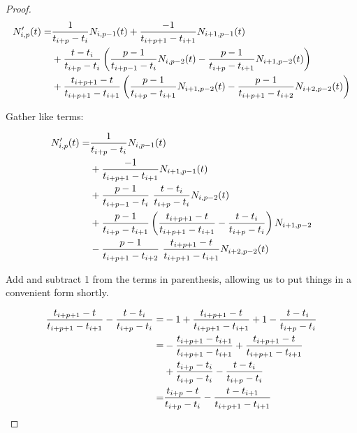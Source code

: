 \begin{appendices}
\begin{proof}
\begin{equation}
\begin{split}
N_{i,p}'(t) =& \frac{1}{t_{i+p} - t_i} N_{i,p-1}(t) + \frac{-1}{t_{i+p+1} - t_{i+1}} N_{i+1,p-1}(t) \\ 
& + \frac{t-t_i}{t_{i+p}-t_i} \left( \frac{p-1}{t_{i+p-1} - t_i} N_{i,p-2}(t) - \frac{p-1}{t_{i+p} - t_{i+1}} N_{i+1,p-2}(t) \right) \\
&+ \frac{t_{i+p+1}-t}{t_{i+p+1}-t_{i+1}} \left( \frac{p-1}{t_{i+p} - t_{i+1}} N_{i+1,p-2}(t) - \frac{p-1}{t_{i+p+1} - t_{i+2}} N_{i+2,p-2}(t) \right)
\end{split}\raisetag{3\baselineskip}
\end{equation}

Gather like terms:

\begin{equation}
\begin{split}
\label{eqn:gatherterms}
N_{i,p}'(t) =& \frac{1}{t_{i+p} - t_i} N_{i,p-1}(t)\\
& + \frac{-1}{t_{i+p+1} - t_{i+1}} N_{i+1,p-1}(t) \\ 
& + \frac{p-1}{t_{i+p-1} - t_i} ~\frac{t-t_i}{t_{i+p}-t_i} N_{i,p-2}(t)\\
& + \frac{p-1}{t_{i+p} - t_{i+1}} \left( \frac{t_{i+p+1}-t}{t_{i+p+1}-t_{i+1}} - \frac{t-t_i}{t_{i+p}-t_i}\right)  N_{i+1,p-2}\\
& - \frac{p-1}{t_{i+p+1} - t_{i+2}}~\frac{t_{i+p+1}-t}{t_{i+p+1}-t_{i+1}} N_{i+2,p-2}(t)
\end{split}\raisetag{3\baselineskip}
\end{equation}

Add and subtract 1 from the terms in parenthesis, allowing us to put things in a convenient form shortly.

\begin{equation}
\begin{split}
\label{eqn:plusminus1}
\frac{t_{i+p+1}-t}{t_{i+p+1}-t_{i+1}} - \frac{t-t_i}{t_{i+p}-t_i} =& -1 + \frac{t_{i+p+1}-t}{t_{i+p+1}-t_{i+1}} +1 - \frac{t-t_i}{t_{i+p}-t_i}\\
	=& -\frac{t_{i+p+1} - t_{i+1}}{t_{i+p+1} - t_{i+1}} + \frac{t_{i+p+1}-t}{t_{i+p+1}-t_{i+1}}\\
	&+ \frac{t_{i+p} - t_{i}}{t_{i+p} - t_{i}} - \frac{t-t_i}{t_{i+p}-t_i}\\
	=& \frac{t_{i+p} - t}{t_{i+p} - t_{i}} - \frac{t - t_{i+1}}{t_{i+p+1} - t_{i+1}}
\end{split}\raisetag{3\baselineskip}
\end{equation}


\end{proof}
\end{appendices}
